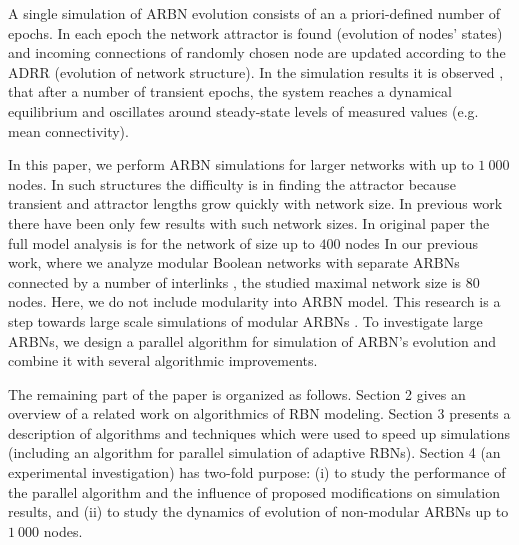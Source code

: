 \documentclass[procedia]{easychair}
\begin{document}
	A single simulation of ARBN evolution consists of an a priori-defined number of epochs. In each epoch the network attractor is found (evolution of nodes' states) and incoming connections of randomly chosen node are updated according to the ADRR (evolution of network structure). 
	In the simulation results it is observed \cite{mlb,Gorski2016}, that after a number of transient epochs, the system reaches a dynamical equilibrium and oscillates around steady-state levels of measured values (e.g. mean connectivity). 
	
	In this paper, we perform ARBN simulations for larger networks with up to $1~000$ nodes. 
	In such structures the difficulty is in finding the attractor because transient and attractor lengths grow quickly with network size. 
	In previous work there have been only few results with such network sizes. In original paper \cite{mlb} the full model analysis is for the network of size up to $400$ nodes
	In our previous work, where we analyze modular Boolean networks with separate ARBNs connected by a number of interlinks \cite{Gorski2016}, the studied maximal network size is $80$ nodes. 
	Here, we do not include modularity into ARBN model. 
	This research is a step towards large scale simulations of modular ARBNs \cite{Gorski2016}. To investigate large ARBNs, we design a parallel algorithm for simulation of ARBN's evolution and combine it with several algorithmic improvements.
	
	The remaining part of the paper is organized as follows. Section 2 gives an overview of a related work on algorithmics of RBN modeling. Section 3 presents a description of algorithms and techniques which were used to speed up simulations (including an algorithm for parallel simulation of adaptive RBNs). Section 4 (an experimental investigation) has two-fold purpose: (i) to study the performance of the parallel algorithm and the influence of proposed modifications on simulation results, and (ii) to study the dynamics of evolution of non-modular ARBNs up to $1~000$ nodes.

\end{document}

